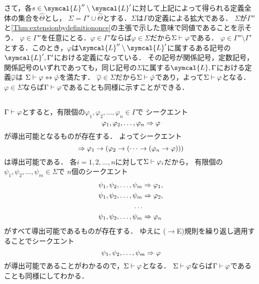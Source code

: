 さて，各\(s \in \symcal{L}'' \setminus \symcal{L}'\)に対して上記によって得られる定義全体の集合を\(\hat{\Theta}\)とし，
\(\Sigma = \Gamma' \cup \hat{\Theta}\)とする．\(\Sigma\)は\(\Gamma\)の定義による拡大である．
\(\Sigma\)が\(\Gamma''\)と\cref{Thm:extensionbydefinitiononce}の主張で示した意味で同値であることを示そう．
\(\varphi \in \Gamma''\)を任意にとる．\(\varphi \in \Gamma'\)ならば\(\varphi \in \Sigma\)だから\(\Sigma \vdash \varphi\)である．
\(\varphi \in \Gamma'' \setminus \Gamma'\)とする．このとき，\(\varphi\)は\(\symcal{L}'' \setminus \symcal{L}'\)に属するある記号の\(\symcal{L}', \Gamma'\)における定義になっている．
その記号が関係記号，定数記号，関係記号のいずれであっても，同じ記号の\(\Sigma\)に属する\(\symcal{L}, \Gamma\)における定義\(\hat{\varphi}\)は
\(\Sigma \vdash \varphi \leftrightarrow \hat{\varphi}\)を満たす．
\(\hat{\varphi} \in \Sigma\)だから\(\Sigma \vdash \hat{\varphi}\)であり，よって\(\Sigma \vdash \varphi\)となる．
\(\varphi \in \Sigma\)ならば\(\Gamma \vdash \varphi\)であることも同様に示すことができる．

\subsection*{}

\(\Gamma \vdash \varphi\)とすると，有限個の\(\varphi_1, \varphi_2, \dots, \varphi_n \in \Gamma\)で
シークエント
\[
	\varphi_1, \varphi_2, \dots, \varphi_n \Rightarrow \varphi
\]
が導出可能となるものが存在する．
よってシークエント
\[
	\sequent \varphi_1 \to \paren{\varphi_2 \to \paren{\dotsb \to \paren{\varphi_n \to \varphi}}}
\]
は導出可能である．
各\(i = 1,2,\dots,n\)に対して\(\Sigma \vdash \varphi_i\)だから，
有限個の\(\psi_1, \psi_2, \dots, \psi_m \in \Sigma\)で
\(n\)個のシークエント
\begin{align*}
	\psi_1, \psi_2, \dots, \psi_m & \Rightarrow \varphi_1, \\
	\psi_1, \psi_2, \dots, \psi_m & \Rightarrow \varphi_2, \\
	\dots                                               \\
	\psi_1, \psi_2, \dots, \psi_m & \Rightarrow \varphi_n  \\
\end{align*}
がすべて導出可能であるものが存在する．
ゆえに
(\(\to\)E)規則を繰り返し適用することでシークエント
\[
	\psi_1, \psi_2, \dots, \psi_m \Rightarrow \varphi
\]
が導出可能であることがわかるので，\(\Sigma \vdash \varphi\)となる．
\(\Sigma \vdash \varphi\)ならば\(\Gamma \vdash \varphi\)であることも同様にしてわかる．


